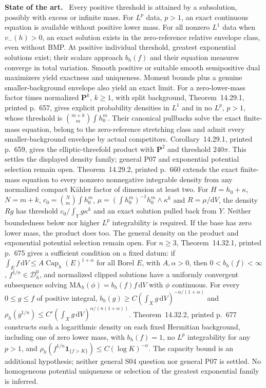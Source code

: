 \documentclass[11pt]{article}
\newcommand{\field}[1]{\par\medskip\noindent\textbf{#1.}\ }
\begin{document}
\field{State of the art} Every positive threshold is attained by a subsolution, possibly with excess or infinite mass. For $L^p$ data, $p>1$, an exact continuous equation is available without positive lower mass. For all nonzero $L^1$ data when $v_-(h)>0$, an exact solution exists in the zero-reference relative envelope class, even without BMP. At positive individual threshold, greatest exponential solutions exist; their scalars approach $b_h(f)$ and their equation measures converge in total variation. Smooth positive or suitable smooth semipositive dual maximizers yield exactness and uniqueness. Moment bounds plus a genuine smaller-background envelope also yield an exact limit. For a zero-lower-mass factor times normalized $\mathbf P^k$, $k\geq1$, with split background, Theorem~14.29.1, printed p.~657, gives explicit probability densities in $L^1$ and in no $L^p$, $p>1$, whose threshold is $\binom{m+k}{m}\int h_0^m$. Their canonical pullbacks solve the exact finite-mass equation, belong to the zero-reference stretching class and admit every smaller-background envelope by actual competitors. Corollary~14.29.1, printed p.~659, gives the elliptic-threefold product with $\mathbf P^2$ and threshold $240\pi$. This settles the displayed density family; general P07 and exponential potential selection remain open. Theorem~14.29.2, printed p.~660 extends the exact finite-mass equation to every nonzero nonnegative integrable density from any normalized compact K\"ahler factor of dimension at least two. For $H=h_0+\kappa$, $N=m+k$, $c_0=\binom Nm\int h_0^m$, $\mu=(\int h_0^m)^{-1}h_0^m\wedge\kappa^k$ and $R=\mu/\mathrm dV$, the density $Rg$ has threshold $c_0/\int_Yg\kappa^k$ and an exact solution pulled back from $Y$. Neither boundedness below nor higher $L^p$ integrability is required. If the base has zero lower mass, the product does too. The general density on the product and exponential potential selection remain open. For $n\geq3$, Theorem~14.32.1, printed p.~675 gives a sufficient condition on a fixed datum: if $\int_Ef\,\mathrm dV\leq A\operatorname{Cap}_h(E)^{1+\alpha}$ for all Borel $E$, with $A,\alpha>0$, then $0<b_h(f)<\infty$, $f^{1/n}\in\mathcal D_h^0$, and normalized clipped solutions have a uniformly convergent subsequence solving $\mathrm{MA}_h(\phi)=b_h(f)f\,\mathrm dV$ with $\phi$ continuous. For every $0\leq g\leq f$ of positive integral, $b_h(g)\geq C(\int_Xg\,\mathrm dV)^{-\alpha/(1+\alpha)}$ and $\rho_h(g^{1/n})\leq C'(\int_Xg\,\mathrm dV)^{\alpha/(n(1+\alpha))}$. Theorem~14.32.2, printed p.~677 constructs such a logarithmic density on each fixed Hermitian background, including one of zero lower mass, with $b_h(f)=1$, no $L^p$ integrability for any $p>1$, and $\rho_h(f^{1/n}\mathbf1_{\{f>K\}})\leq C(\log K)^{-\alpha}$. The capacity bound is an additional hypothesis; neither general S04 question nor general P07 is settled. No homogeneous potential uniqueness or selection of the greatest exponential family is inferred.
\end{document}
